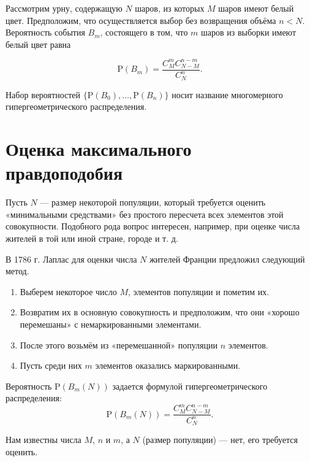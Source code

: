 \documentclass[11pt,a4paper]{article}
\providecommand{\tightlist}{%
      \setlength{\itemsep}{0pt}\setlength{\parskip}{0pt}}
\begin{document}
Рассмотрим урну, содержащую \(N\) шаров, из которых \(M\) шаров имеют
белый цвет. Предположим, что осуществляется выбор без возвращения объёма
\(n < N\). Вероятность события \(B_m\), состоящего в том, что \(m\)
шаров из выборки имеют белый цвет равна

\[ \mathrm{P}(B_m) = \dfrac{C_M^m C_{N-M}^{n-m}}{C_N^n}. \]

Набор вероятностей \(\{\mathrm{P}(B_0), \ldots,\mathrm{P}(B_n)\}\) носит
название многомерного гипергеометрического распределения.

    \hypertarget{ux43eux446ux435ux43dux43aux430-ux43cux430ux43aux441ux438ux43cux430ux43bux44cux43dux43eux433ux43e-ux43fux440ux430ux432ux434ux43eux43fux43eux434ux43eux431ux438ux44f}{%
\section{Оценка максимального
правдоподобия}\label{ux43eux446ux435ux43dux43aux430-ux43cux430ux43aux441ux438ux43cux430ux43bux44cux43dux43eux433ux43e-ux43fux440ux430ux432ux434ux43eux43fux43eux434ux43eux431ux438ux44f}}

Пусть \(N\) --- размер некоторой популяции, который требуется оценить
«минимальными средствами» без простого пересчета всех элементов этой
совокупности. Подобного рода вопрос интересен, например, при оценке
числа жителей в той или иной стране, городе и т. д.

В 1786 г. Лаплас для оценки числа \(N\) жителей Франции предложил
следующий метод.

\begin{enumerate}
\def\labelenumi{\arabic{enumi}.}
\tightlist
\item
  Выберем некоторое число \(M\), элементов популяции и пометим их.
\item
  Возвратим их в основную совокупность и предположим, что они «хорошо
  перемешаны» с немаркированными элементами.
\item
  После этого возьмём из «перемешанной» популяции \(n\) элементов.
\item
  Пусть среди них \(m\) элементов оказались маркированными.
\end{enumerate}

Вероятность \(\mathrm{P}(B_m(N))\) задается формулой
гипергеометрического распределения: \[
    \mathrm{P}(B_m(N)) = \frac{C_M^m C_{N-M}^{n-m}}{C_N^n}. \tag{1}\label{eq:prob}
\]

Нам известны числа \(M\), \(n\) и \(m\), а \(N\) (размер популяции) ---
нет, его требуется оценить.
\end{document}
